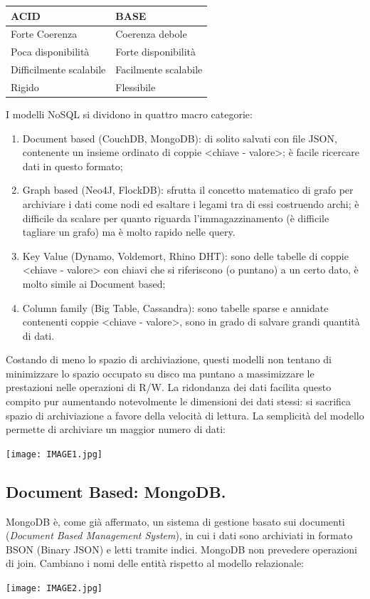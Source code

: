\documentclass[a4page, 11pt]{article}
\begin{document}
\begin{center}
\begin{tabular}{l|l}
ACID & BASE \\
\hline
Forte Coerenza & Coerenza debole \\
Poca disponibilità & Forte disponibilità \\
Difficilmente scalabile & Facilmente scalabile\\
Rigido & Flessibile \\
\end{tabular}
\end{center}

I modelli NoSQL si dividono in quattro macro categorie\cite{NoSQLDB, GraphDB}:
\begin{enumerate}[noitemsep]
\item Document based (CouchDB, MongoDB): di solito salvati con file JSON, contenente un insieme ordinato di coppie \textless{}chiave - valore\textgreater{}; è facile ricercare dati in questo formato;
\item Graph based (Neo4J, FlockDB): sfrutta il concetto matematico di grafo per archiviare i dati come nodi ed esaltare i legami tra di essi costruendo archi; è difficile da scalare per quanto riguarda l'immagazzinamento (è difficile tagliare un grafo) ma è molto rapido nelle query.
\item Key Value (Dynamo, Voldemort, Rhino DHT): sono delle tabelle di coppie \textless{}chiave - valore\textgreater{} con chiavi che si riferiscono (o puntano) a un certo dato, è molto simile ai Document based;
\item Column family (Big Table, Cassandra): sono tabelle sparse e annidate contenenti coppie \textless{}chiave - valore\textgreater{}, sono in grado di salvare grandi quantità di dati.
\end{enumerate}

Costando di meno lo spazio di archiviazione, questi modelli non tentano di minimizzare lo spazio occupato su disco ma puntano a massimizzare le prestazioni nelle operazioni di R/W.
La ridondanza dei dati facilita questo compito pur aumentando notevolmente le dimensioni dei dati stessi: si sacrifica spazio di archiviazione a favore della velocità di lettura.
La semplicità del modello permette di archiviare un maggior numero di dati:
\begin{center}
	\texttt{[image: IMAGE1.jpg]}
\end{center}


\subsection{Document Based: MongoDB\cite{MongoDB, ScalingMongoDB}.}
MongoDB è, come già affermato, un sistema di gestione basato sui documenti (\textit{Document Based Management System}), in cui i dati sono archiviati in formato BSON (Binary JSON) e letti tramite indici.
MongoDB non prevedere operazioni di join.
Cambiano i nomi delle entità rispetto al modello relazionale:
\begin{center}
  \texttt{[image: IMAGE2.jpg]}
\end{center}
\end{document}
